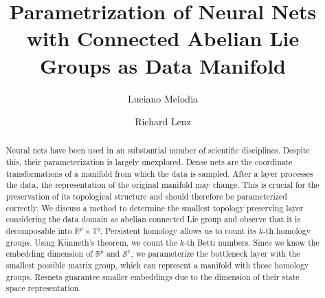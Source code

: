 \documentclass[envcountsect,runningheads]{llncs}
\begin{document}
%
\title{Parametrization of Neural Nets with Connected Abelian Lie Groups as Data Manifold}
%
%
\author{Luciano Melodia \\
\and Richard Lenz}
%
%
%
\maketitle              %
%
\begin{abstract}
Neural nets have been used in an substantial number of scientific disciplines. Despite this, their parameterization is largely unexplored. Dense nets are the coordinate transformations of a manifold from which the data is sampled. After a layer processes the data, the representation of the original manifold may change. This is crucial for the preservation of its topological structure and should therefore be parameterized correctly. We discuss a method to determine the smallest topology preserving layer considering the data domain as abelian connected Lie group and observe that it is decomposable into $\mathbb{R}^p \times \mathbb {T}^q$. Persistent homology allows us to count its $k$-th homology groups. Using Künneth's theorem, we count the $k$-th Betti numbers. Since we know the embedding dimension of $\mathbb{R}^p$ and $\mathcal{S}^1$, we parameterize the bottleneck layer with the smallest possible matrix group, which can represent a manifold with those homology groups. Resnets guarantee smaller embeddings due to the dimension of their state space representation.

\end{abstract}
\end{document}

